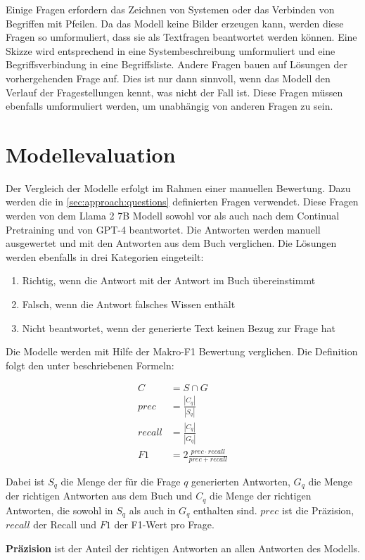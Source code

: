 Einige Fragen erfordern das Zeichnen von Systemen oder das Verbinden von Begriffen mit Pfeilen.
Da das Modell keine Bilder erzeugen kann, werden diese Fragen so umformuliert, dass sie als Textfragen beantwortet werden können.
Eine Skizze wird entsprechend in eine Systembeschreibung umformuliert und eine Begriffsverbindung in eine Begriffsliste.
Andere Fragen bauen auf Lösungen der vorhergehenden Frage auf.
Dies ist nur dann sinnvoll, wenn das Modell den Verlauf der Fragestellungen kennt, was nicht der Fall ist.
Diese Fragen müssen ebenfalls umformuliert werden, um unabhängig von anderen Fragen zu sein.

\section{Modellevaluation}\label{sec:approach:comparison}
Der Vergleich der Modelle erfolgt im Rahmen einer manuellen Bewertung.
Dazu werden die in \cref{sec:approach:questions} definierten Fragen verwendet.
Diese Fragen werden von dem Llama 2 7B Modell sowohl vor als auch nach dem Continual Pretraining und von GPT-4 beantwortet.
Die Antworten werden manuell ausgewertet und mit den Antworten aus dem Buch \citet{bb} verglichen.
Die Lösungen werden ebenfalls in drei Kategorien eingeteilt:
\begin{enumerate}
    \item Richtig, wenn die Antwort mit der Antwort im Buch übereinstimmt
    \item Falsch, wenn die Antwort falsches Wissen enthält
    \item Nicht beantwortet, wenn der generierte Text keinen Bezug zur Frage hat
\end{enumerate}

Die Modelle werden mit Hilfe der Makro-F1 Bewertung verglichen.
Die Definition folgt den unter \citet{chatgpt_qas} beschriebenen Formeln:
\begin{ceqn}
    \begin{align}
        C      & = S \cap G                                 \\
        prec   & = \frac{|C_{q}|}{|S_{q}|}                  \\
        recall & = \frac{|C_{q}|}{|G_{q}|}                  \\
        F1     & = 2\frac{prec \cdot recall}{prec + recall}
    \end{align}
\end{ceqn}
Dabei ist $S_q$ die Menge der für die Frage $q$ generierten Antworten, $G_q$ die Menge der richtigen Antworten aus dem Buch \citet{bb} und $C_q$ die Menge der richtigen Antworten, die sowohl in $S_q$ als auch in $G_q$ enthalten sind.
$prec$ ist die Präzision, $recall$ der Recall und $F1$ der F1-Wert pro Frage.
\begin{definition}
    \textbf{Präzision} ist der Anteil der richtigen Antworten an allen Antworten des Modells.
\end{definition}

